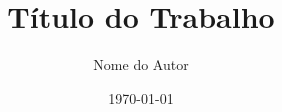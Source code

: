 
\author{Nome do Autor}
\title{Título do Trabalho}
\date{\today} %

\makeatletter
{}
\makeatother

\newcommand{\supervisor}{Nome do Orientador}
\newcommand{\versao}{Versão Original} %
\newcommand{\instituicao}{Instituição de Ensino}
\newcommand{\proposito}{Dissertação apresentada à {\instituicao{}} para obtenção do título de mestre em ciências} %
\newcommand{\extrainfo}{Área de Concentração: Engenharia \\ Hidráulica e Ambiental} %
\newcommand{\local}{Cidade}
